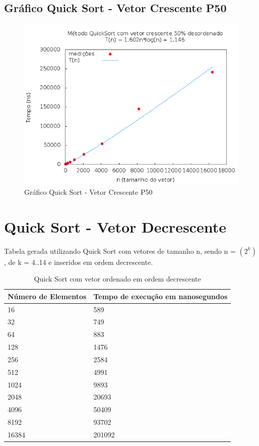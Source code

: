 \documentclass[12pt,a4paper,twoside]{report}
\begin{document}
\subsection{Gráfico Quick Sort - Vetor Crescente P50}
\begin{figure}[H]
    \centering
    \includegraphics[width=0.7\linewidth]{graficos/QuickSort/vIntCrescenteP50/vIntCrescenteP50.png}
  \caption{Gráfico Quick Sort - Vetor Crescente P50}
\end{figure}

\section{Quick Sort - Vetor Decrescente}
Tabela gerada utilizando Quick Sort com vetores de tamanho n, sendo n = $(2^k)$, de k = 4..14 e inseridos em ordem decrescente.
\begin{table}[H]
\centering
\caption{Quick Sort com vetor ordenado em ordem decrescente}
\label{my-label}
\begin{tabular}{|l|l|}
\hline
\multicolumn{1}{|c|}{\textbf{Número de Elementos}} & \multicolumn{1}{c|}{\textbf{Tempo de execução em nanosegundos}} \\ \hline
16 & 589 \\ \hline
32 & 749 \\ \hline
64 & 883 \\ \hline
128 & 1476 \\ \hline
256 & 2584 \\ \hline
512 & 4991 \\ \hline
1024 & 9893 \\ \hline
2048 & 20693 \\ \hline
4096 & 50409 \\ \hline
8192 & 93702 \\ \hline
16384 & 201092 \\ \hline
\end{tabular}
\end{table}
\end{document}
